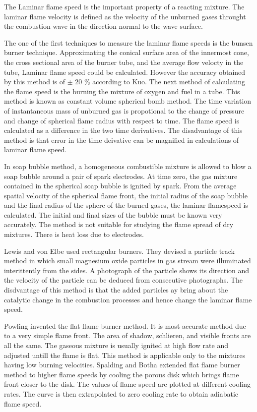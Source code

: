 \noindent The Laminar flame speed is the important property of a reacting mixture. The laminar flame velocity is defined as the velocity of the unburned gases throught the combustion wave in the direction normal to the wave surface. 

\noindent The one of the first techniques to measure the laminar flame speeds is the bunsen burner technique. Approximating the conical surface area of the innermost cone, the cross sectional area of the burner tube, and the average flow velocty in the tube, Laminar flame speed could be calculated. However the accuracy obtained by this method is of $\pm $ 20 \% according to Kuo\cite{Kuo}. The next method of calculating the flame speed is the burning the mixture of oxygen and fuel in a tube. This method is known as constant volume spherical bomb method\cite{Kuo}. The time variation of instantaneous mass of unburned gas is propotional to the change of pressure and change of spherical flame radius with respect to time. The flame speed is calculated as a difference in the two time derivatives. The disadvantage of this method is that error in the time deivative can be magnified in calculations of laminar flame speed. 

\noindent In soap bubble method, a homogeneous combustible mixture is allowed to blow a soap bubble around a pair of spark electrodes. At time zero, the gas mixture contained in the spherical soap bubble is ignited by spark. From the average spatial velocity of the spherical flame front, the initial radius of the soap bubble and the final radius of the sphere of the burned gases, the laminar flamespeed is calculated. The initial and final sizes of the bubble must be known very accurately. The method is not suitable for studying the flame spread of dry mixtures. There is heat loss due to electrodes. 

\noindent Lewis and von Elbe\cite{lewis} used rectangular burners. They devised a particle track method in which small magnesium oxide particles in gas stream were illuminated interittently from the sides. A photograph of the particle shows its direction and the velocity of the particle can be deduced from consecutive photographs. The disdvantage of this method is that the added particles ay bring about the catalytic change in the combustion processes and hence change the laminar flame speed. 

\noindent Powling\cite{powling} invented the flat flame burner method. It is most accurate method due to a very simple flame front. The area of shadow, schlieren, and visible fronts are all the same. The gaseous mixture is usually ignited at high flow rate and adjusted untill the flame is flat. This method is applicable only to the mixtures having low burning velocities. Spalding and Botha\cite{splading} extended flat flame burner method to higher flame speeds by cooling the porous disk which brings flame front closer to the disk. The values of flame speed are plotted at different cooling rates. The curve is then extrapolated to zero cooling rate to obtain adiabatic flame speed. 

